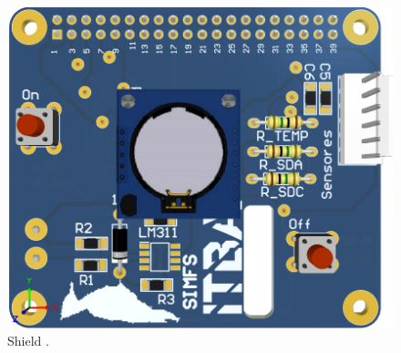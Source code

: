\begin{figure}[H]
	\centering
	\includegraphics[width=0.75\linewidth,page=1]{ImagenesIngenieria de Detalle/shield}		
	\caption{Shield \rspi.}
	\label{fig:conexionado_Rpi}
\end{figure}

